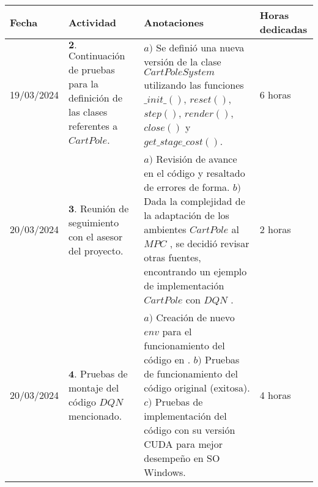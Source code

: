 \documentclass[12pt]{article}
\begin{document}
\begin{minipage}[h]{\textwidth}
	\centering
	\begin{tabularx}{\textwidth}{|p{2cm}|X|X|p{2cm}|} 
		\hline
		\rowcolor{encabezado}
		\textbf{Fecha} & 
		\textbf{Actividad} & 
		\textbf{Anotaciones} & 
		\textbf{Horas dedicadas} \\ \hline
	 	19/03/2024 & 
	 	$\mathbf{2}.$ Continuación de pruebas para la definición de las clases referentes a $CartPole$. & 
	 	$a)$ Se definió una nueva versión de la clase $CartPoleSystem$ utilizando las funciones $\_init\_()$, $reset()$, $step()$, $render()$, $close()$ y $get\_stage\_cost()$. \newline & 
	 	6 horas \\
	 	20/03/2024 & 
	 	$\mathbf{3}.$ Reunión de seguimiento con el asesor del proyecto. & 
	 	$a)$ Revisión de avance en el código y resaltado de errores de forma.  \newline
	 	$b)$ Dada la complejidad de la adaptación de los ambientes $CartPole$ al $MPC$ \cite{Airdaldi2023}, se decidió revisar otras fuentes, encontrando un ejemplo de implementación $CartPole$ con \href{https://pytorch.org/tutorials/intermediate/reinforcement_q_learning.html}{$DQN$} \cite{DQNCart}.  \newline & 
	 	2 horas \\
	 	20/03/2024 & 
	 	$\mathbf{4}.$ Pruebas de montaje del código $DQN$ mencionado. & 
	 	$a)$ Creación de nuevo $env$ para el funcionamiento del código en \cite{DQNCart}. \newline
	 	$b)$ Pruebas de funcionamiento del código original (exitosa). \newline
	 	$c)$ Pruebas de implementación del código con su versión CUDA para mejor desempeño en SO Windows. \newline & 
	 	4 horas \\
	 	
	 	\hline
	\end{tabularx}
\end{minipage}	 	
	 	
\end{document}
